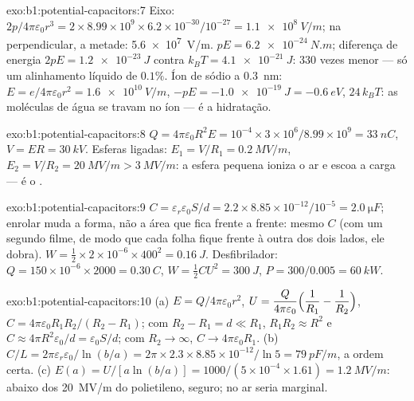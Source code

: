 \begin{solution}{exo:b1:potential-capacitors:7}
Eixo: $2p/4\pi\varepsilon_0r^3 = 2 \times 8.99 \times 10^9 \times 6.2 \times 10^{-30}/10^{-27} =
\qty{1.1e8}{V/m}$; na perpendicular, a metade: \qty{5.6e7}{V/m}.  $pE =
\qty{6.2e-24}{N.m}$; diferença de energia $2pE = \qty{1.2e-23}{J}$ contra $k_BT =
\qty{4.1e-21}{J}$: $330$ vezes menor --- só um alinhamento líquido de $0.1\%$.
Íon de sódio a \qty{0.3}{nm}: $E = e/4\pi\varepsilon_0r^2 = \qty{1.6e10}{V/m}$, $-pE
= \qty{-1.0e-19}{J} = \qty{-0.6}{eV}$, $24\,k_BT$: as moléculas de água se travam
no íon --- é a hidratação.
\end{solution}

\begin{solution}{exo:b1:potential-capacitors:8}
$Q = 4\pi\varepsilon_0R^2E = 10^{-4} \times 3 \times 10^6/8.99 \times 10^9 = \qty{33}{nC}$,
$V = ER = \qty{30}{kV}$. Esferas ligadas: $E_1 = V/R_1 = \qty{0.2}{MV/m}$,
$E_2 = V/R_2 = \qty{20}{MV/m} > \qty{3}{MV/m}$: a esfera pequena ioniza o
ar e escoa a carga --- é o .
\end{solution}

\begin{solution}{exo:b1:potential-capacitors:9}
$C = \varepsilon_r\varepsilon_0S/d = 2.2 \times 8.85 \times 10^{-12}/10^{-5} = \qty{2.0}{\micro F}$;
enrolar muda a forma, não a área que fica frente a frente: mesmo $C$ (com um segundo
filme, de modo que cada folha fique frente à outra dos dois lados, ele dobra).
$W = \tfrac12 \times 2 \times 10^{-6} \times 400^2 = \qty{0.16}{J}$. Desfibrilador:
$Q = 150 \times 10^{-6} \times 2000 = \qty{0.30}{C}$, $W = \tfrac12CU^2 = \qty{300}{J}$,
$P = 300/0.005 = \qty{60}{kW}$.
\end{solution}

\begin{solution}{exo:b1:potential-capacitors:10}
(a) $E = Q/4\pi\varepsilon_0r^2$, $U = \dfrac{Q}{4\pi\varepsilon_0}\Bigl(\dfrac1{R_1} -
\dfrac1{R_2}\Bigr)$, $C = 4\pi\varepsilon_0R_1R_2/(R_2 - R_1)$; com $R_2 - R_1 = d \ll
R_1$, $R_1R_2 \approx R^2$ e $C \approx 4\pi R^2\varepsilon_0/d = \varepsilon_0S/d$; com $R_2 \to
\infty$, $C \to 4\pi\varepsilon_0R_1$. (b) $C/L = 2\pi\varepsilon_r\varepsilon_0/\ln(b/a) = 2\pi \times 2.3
\times 8.85 \times 10^{-12}/\ln5 = \qty{79}{pF/m}$, a ordem certa. (c) $E(a) =
U/[a\ln(b/a)] = 1000/(5 \times 10^{-4} \times 1.61) = \qty{1.2}{MV/m}$: abaixo dos
\qty{20}{MV/m} do polietileno, seguro; no ar seria marginal.
\end{solution}

